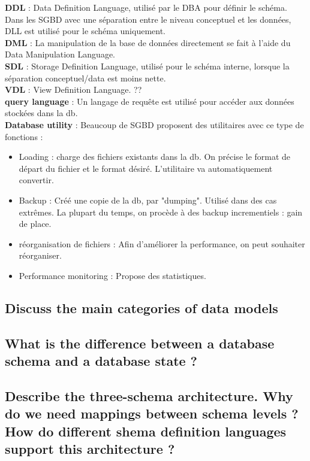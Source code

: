\textbf{DDL} :
Data Definition Language, utilisé par le DBA pour définir le schéma.
Dans les SGBD avec une séparation entre le niveau conceptuel et les données, 
DLL est utilisé pour le schéma uniquement. \\
\textbf{DML} : 
La manipulation de la base de données directement se fait à l'aide du 
Data Manipulation Language.\\
\textbf{SDL} : Storage Definition Language, utilisé pour le schéma interne, lorsque la séparation conceptuel/data est moins nette.\\
\textbf{VDL} : View Definition Language. ?? \\
\textbf{query language} : Un langage de requête est utilisé pour accéder aux données stockées dans la db. \\
\textbf{Database utility} : 
Beaucoup de SGBD proposent des utilitaires avec ce type de fonctions :
\begin{itemize}
	\item Loading : charge des fichiers existants dans la db. On précise le 
	format de départ du fichier et le format désiré. L'utilitaire 
	va automatiquement convertir. 
	 \item Backup : Créé une copie de la db, par "dumping". Utilisé dans des 
	 cas extrêmes. La plupart du temps, on procède à des backup incrementiels : gain de place.
	 \item réorganisation de fichiers : Afin d'améliorer la performance, on peut souhaiter réorganiser.
	 \item Performance monitoring : Propose des statistiques.
\end{itemize}

\subsection{Discuss the main categories of data models}



\subsection{What is the difference between a database schema and a database state ?}

\subsection{Describe the three-schema architecture. Why do we need mappings between schema levels ? How do different shema definition languages support this architecture ?}

